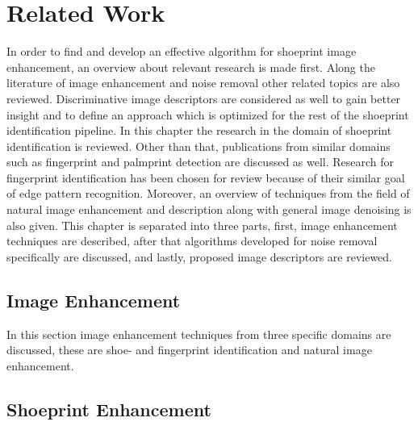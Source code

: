 \documentclass[draft,final]{vutinfth} %
\begin{document}
\chapter{Related Work}
\par
In order to find and develop an effective algorithm for shoeprint image enhancement, an overview about relevant research is made first.
Along the literature of image enhancement and noise removal other related topics are also reviewed.
Discriminative image descriptors are considered as well to gain better insight and to define an approach which is optimized for the rest of the shoeprint identification pipeline.
In this chapter the research in the domain of shoeprint identification is reviewed.
Other than that, publications from similar domains such as fingerprint and palmprint detection are discussed as well.
Research for fingerprint identification has been chosen for review because of their similar goal of edge pattern recognition.
Moreover, an overview of techniques from the field of natural image enhancement and description along with general image denoising is also given.
This chapter is separated into three parts, first, image enhancement techniques are described, after that algorithms developed for noise removal specifically are discussed, and lastly, proposed image descriptors are reviewed.


\section{Image Enhancement}
\label{sec:rw:ImageENhancement}

In this section image enhancement techniques from three specific domains are discussed, these are shoe- and fingerprint identification and natural image enhancement.

\section*{Shoeprint Enhancement}
\end{document}
